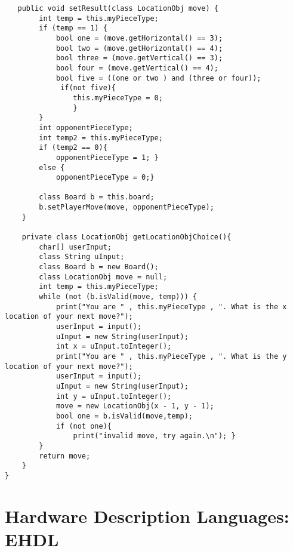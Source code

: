 \documentclass{plt}
\begin{document}
\begin{frame}[fragile]
\fontsize{6pt}{6pt}\selectfont
\begin{verbatim}
   public void setResult(class LocationObj move) {
        int temp = this.myPieceType;
        if (temp == 1) {
            bool one = (move.getHorizontal() == 3);
            bool two = (move.getHorizontal() == 4);
            bool three = (move.getVertical() == 3);
            bool four = (move.getVertical() == 4);
            bool five = ((one or two ) and (three or four)); 
             if(not five){
                this.myPieceType = 0;
                }
        }
        int opponentPieceType;
        int temp2 = this.myPieceType;
        if (temp2 == 0){
            opponentPieceType = 1; }
        else {
            opponentPieceType = 0;}

        class Board b = this.board;
        b.setPlayerMove(move, opponentPieceType);
    }

    private class LocationObj getLocationObjChoice(){ 
        char[] userInput;
        class String uInput;
        class Board b = new Board();
        class LocationObj move = null;
        int temp = this.myPieceType;    
        while (not (b.isValid(move, temp))) { 
            print("You are " , this.myPieceType , ". What is the x location of your next move?");
            userInput = input();
            uInput = new String(userInput);
            int x = uInput.toInteger();
            print("You are " , this.myPieceType , ". What is the y location of your next move?");
            userInput = input();
            uInput = new String(userInput);
            int y = uInput.toInteger();
            move = new LocationObj(x - 1, y - 1);
            bool one = b.isValid(move,temp);
            if (not one){
                print("invalid move, try again.\n"); }
        } 
        return move;
    }
}
\end{verbatim}
\end{frame}

\section{Hardware Description Languages: EHDL}
\end{document}
